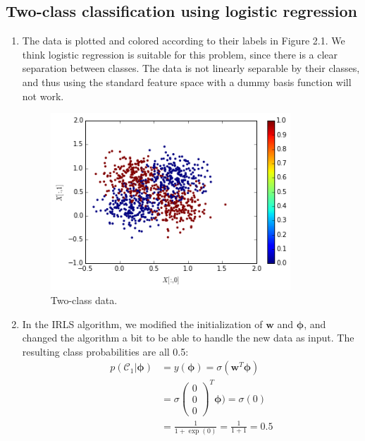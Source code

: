 \documentclass[a4paper,10pt]{article}
\numberwithin{equation}{section} %
\numberwithin{figure}{section} %
\numberwithin{table}{section} %
\theoremstyle{mytheor}
\begin{document}
\subsection{Two-class classification using logistic regression}
\begin{enumerate}
	\item The data is plotted and colored according to their labels in Figure 2.1. We think logistic regression is suitable for this problem, since there is a clear separation between classes. The data is not linearly separable by their classes, and thus using the standard feature space with a dummy basis function will not work. 
		\begin{figure}[h!]
   			\centering
   			\includegraphics[width=0.85\textwidth]{exercise2plotta.png}\vspace{-0.4cm}
   			\caption{\vspace{-0.0cm} Two-class data.}
  		\end{figure}
	\item In the IRLS algorithm, we modified the initialization of $\boldsymbol{w}$ and $\boldsymbol{\phi}$, and changed the algorithm a bit to be able to handle the new data as input. The resulting class probabilities are all 0.5:
		\begin{align}
		p(\mathcal{C}_1 | \boldsymbol{\phi}) &= y(\boldsymbol{\phi}) = \sigma(\boldsymbol{w}^T\boldsymbol{\phi})\\
		&= \sigma \begin{pmatrix} 0\\0\\0 \end{pmatrix}^T \boldsymbol{\phi}) = \sigma(0) \\
		&= \frac{1}{1+\exp(0)} = \frac{1}{1+1} = 0.5
		\end{align}

\end{enumerate}
\end{document}
